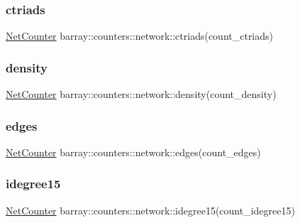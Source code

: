 \subsubsection{\texorpdfstring{ctriads}{ctriads}}
{\footnotesize\ttfamily \hyperlink{namespacebarray_1_1counters_1_1network_a0246d66b7032c9d44a10d4fd025e1ac5}{Net\+Counter} barray\+::counters\+::network\+::ctriads(count\+\_\+ctriads)}

\mbox{\label{namespacebarray_1_1counters_1_1network_ad98ee6184e0d59ad158265b3c11e5f10}} 
\subsubsection{\texorpdfstring{density}{density}}
{\footnotesize\ttfamily \hyperlink{namespacebarray_1_1counters_1_1network_a0246d66b7032c9d44a10d4fd025e1ac5}{Net\+Counter} barray\+::counters\+::network\+::density(count\+\_\+density)}

\mbox{\label{namespacebarray_1_1counters_1_1network_a118232d675536b4c77cd34f2d9b468de}} 
\subsubsection{\texorpdfstring{edges}{edges}}
{\footnotesize\ttfamily \hyperlink{namespacebarray_1_1counters_1_1network_a0246d66b7032c9d44a10d4fd025e1ac5}{Net\+Counter} barray\+::counters\+::network\+::edges(count\+\_\+edges)}

\mbox{\label{namespacebarray_1_1counters_1_1network_aea699d4246f888aaae8572385953e7c5}} 
\subsubsection{\texorpdfstring{idegree15}{idegree15}}
{\footnotesize\ttfamily \hyperlink{namespacebarray_1_1counters_1_1network_a0246d66b7032c9d44a10d4fd025e1ac5}{Net\+Counter} barray\+::counters\+::network\+::idegree15(count\+\_\+idegree15)}

